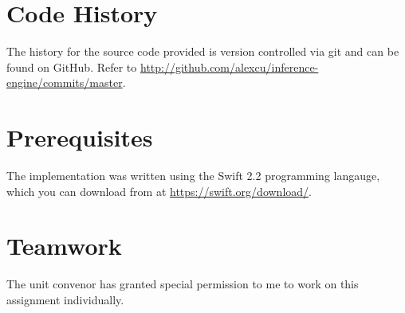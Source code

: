 \section*{Code History}
\label{sec:History}
The history for the source code provided is version controlled via git and can
be found on GitHub. Refer to \url{http://github.com/alexcu/inference-engine/commits/master}.

\section*{Prerequisites}
The implementation was written using the Swift 2.2 programming langauge,
which you can download from at \url{https://swift.org/download/}.

\section*{Teamwork}
The unit convenor has granted special permission to me to work on this assignment
individually.
